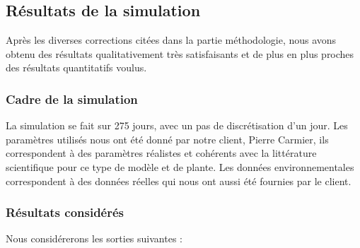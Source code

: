 \subsection{Résultats de la simulation}

Après les diverses corrections citées dans la partie méthodologie, nous avons obtenu des résultats qualitativement très satisfaisants et de plus en plus proches des résultats quantitatifs voulus. 

\subsubsection{Cadre de la simulation}

La simulation se fait sur 275 jours, avec un pas de discrétisation d'un jour. Les paramètres utilisés nous ont été donné par notre client, Pierre Carmier, ils correspondent à des paramètres réalistes et cohérents avec la littérature scientifique pour ce type de modèle et de plante. Les données environnementales correspondent à des données réelles qui nous ont aussi été fournies par le client.

\subsubsection{Résultats considérés}

Nous considérerons les sorties suivantes :


